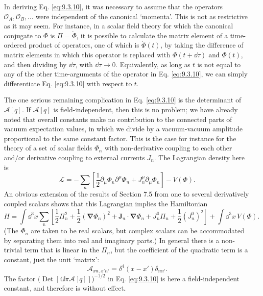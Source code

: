 In deriving Eq. \eqref{eq:9.3.10}, it was necessary to assume that the operators
$\mathcal O_A,\mathcal O_B,\ldots$ were independent of the canonical
`momenta'. This is not as restrictive as it may seem. For instance, in a
scalar field theory for which the canonical conjugate to $\Phi$ is
$\Pi=\dot\Phi$, it is possible to calculate the matrix element of a
time-ordered product of operators, one of which is $\dot\Phi(t)$, by taking
the difference of matrix elements in which this operator is replaced with
$\Phi(t+\dd\tau)$ and $\Phi(t)$, and then dividing by $\dd\tau$, with
$\dd\tau\to0$. Equivalently, as long as $t$ is not equal to any of the other
time-arguments of the operator in Eq. \eqref{eq:9.3.10}, we can simply differentiate
Eq. \eqref{eq:9.3.10} with respect to $t$.

The one serious remaining complication in Eq. \eqref{eq:9.3.10} is the determinant of
$\mathcal A[q]$. If $\mathcal A[q]$ is field-independent, then this is no
problem; we have already noted that overall constants make no contribution to
the connected parts of vacuum expectation values, in which we divide by a
vacuum-vacuum amplitude proportional to the same constant factor. This is the
case for instance for the theory of a set of scalar fields $\Phi_n$ with
non-derivative coupling to each other and/or derivative coupling to external
currents $J_n$. The Lagrangian density here is
\[
\mathcal L=-\sum_n\left[\frac12\partial_\mu\Phi_n\partial^\mu\Phi_n
 +J_n^\mu\partial_\mu\Phi_n\right]-V(\Phi).
\]
An obvious extension of the results of Section 7.5 from one to several
derivatively coupled scalars shows that this Lagrangian implies the Hamiltonian
\[
H=\int \dd^3x\sum_n\left[\frac12\Pi_n^2+\frac12(\boldsymbol\nabla\Phi_n)^2
 +\mathbf J_n\cdot\boldsymbol\nabla\Phi_n+J_n^0\Pi_n
 +\frac12(J_n^0)^2\right]+\int \dd^3x\,V(\Phi).
\]
(The $\Phi_n$ are taken to be real scalars, but complex scalars can be
accommodated by separating them into real and imaginary parts.) In general
there is a non-trivial term that is linear in the $\Pi_n$, but the coefficient
of the quadratic term is a constant, just the unit `matrix':
\[
\mathcal A_{xn,x'n'}=\delta^4(x-x')\delta_{nn'}.
\]
The factor $\bigl(\operatorname{Det}[4\ii\pi\mathcal A[q]]\bigr)^{-1/2}$ in
Eq. \eqref{eq:9.3.10} is here a field-independent constant, and therefore is without
effect.

